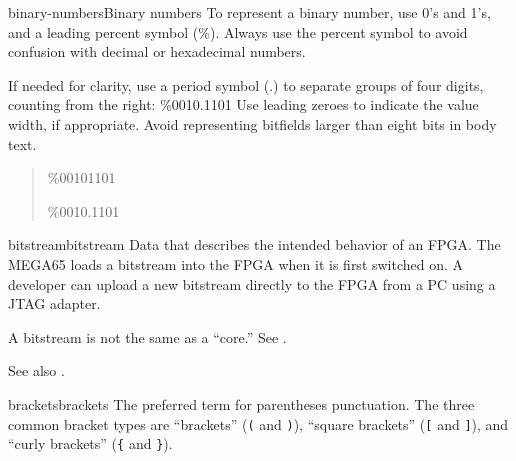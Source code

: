 \begin{sgentry}{binary-numbers}{Binary numbers}
    To represent a binary number, use 0's and 1's, and a leading percent symbol (\%). Always use the percent symbol to avoid confusion with decimal or hexadecimal numbers.

    If needed for clarity, use a period symbol (.) to separate groups of four digits, counting from the right: \%0010.1101 Use leading zeroes to indicate the value width, if appropriate. Avoid representing bitfields larger than eight bits in body text.

    \begin{quote}
        \%00101101

        \%0010.1101
    \end{quote}
\end{sgentry}

\begin{sgentry}{bitstream}{bitstream}
    Data that describes the intended behavior of an FPGA. The MEGA65 loads a bitstream into the FPGA when it is first switched on. A developer can upload a new bitstream directly to the FPGA from a PC using a JTAG adapter.

    A bitstream is not the same as a ``core.'' See .

    See also .
\end{sgentry}

\begin{sgentry}{brackets}{brackets}
    The preferred term for parentheses punctuation. The three common bracket types are ``brackets'' (\texttt{(} and \texttt{)}), ``square brackets'' (\texttt{[} and \texttt{]}), and ``curly brackets'' (\texttt{\{} and \texttt{\}}).
\end{sgentry}

